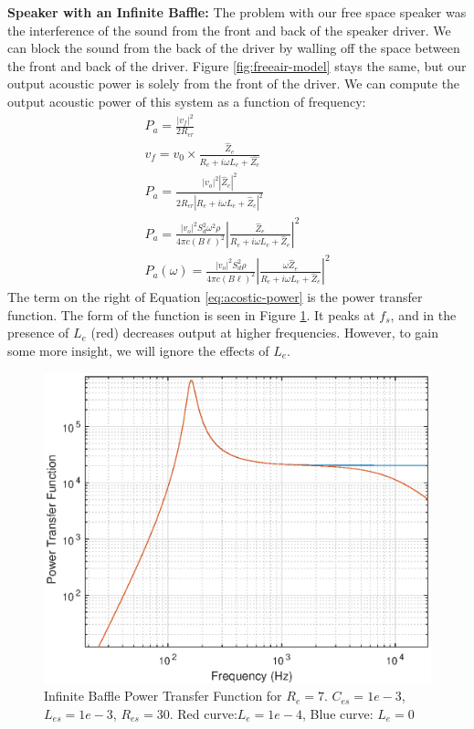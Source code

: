 \documentclass[10pt,letterpaper]{book}
\begin{document}
\textbf{Speaker with an Infinite Baffle:} The problem with our free space speaker was the interference of the sound from the front and back of the speaker driver. We can block the sound from the back of the driver by walling off the space between the front and back of the driver. Figure \ref{fig:freeair-model} stays the same, but our output acoustic power is solely from the front of the driver. We can compute the output acoustic power of this system as a function of frequency:
\begin{align}
P_a=\frac{\left| v_f \right|^2}{2R_{er}}\\
v_f=v_0\times\frac{\hat{Z}_e}{R_e+i\omega L_e+\hat{Z_e}}\\
P_a=\frac{\left| v_o \right|^2 \left| \hat{Z}_e \right|^2 }{2R_{er}\left| R_e+i\omega L_e+\hat{Z}_e\right|^2}\\
P_a=\frac{\left| v_o \right|^2S_d^2\omega^2 \rho}{
4\pi c (B\ell)^2 
}\left| \frac{ \hat{Z}_e }{ R_e+i\omega L_e+\hat{Z}_e} \right|^2\\
P_a(\omega)=\frac{\left| v_o \right|^2S_d^2 \rho}{
4\pi c (B\ell)^2 
}\left| \frac{\omega  \hat{Z}_e }{ R_e+i\omega L_e+\hat{Z}_e} \right|^2 \label{eq:acostic-power}
\end{align}
The term on the right of Equation \ref{eq:acostic-power} is the power transfer function. The form of the function is seen in Figure \ref{fig:power-transfer}. It peaks at $f_s$, and in the presence of $L_e$ (red) decreases output at higher frequencies. However, to gain some more insight, we will ignore the effects of $L_e$.

\begin{figure}
\centering
\includegraphics[width=.75\textwidth]{matlab/infiniteBafflePower.eps}
\caption{Infinite Baffle Power Transfer Function for $R_e=7$.
$C_{es}=1e-3$, $L_{es}=1e-3$, $R_{es}=30$. Red curve:$L_e=1e-4$, Blue curve: $L_e=0$}\label{fig:power-transfer}
\end{figure}
\end{document}
